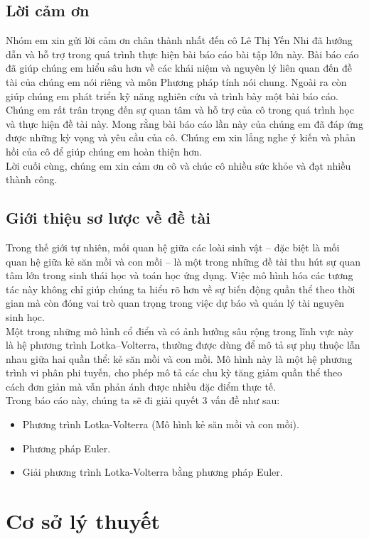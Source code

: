 \documentclass[a4paper,15pt]{article}
\begin{document}
\subsection{Lời cảm ơn}
Nhóm em xin gửi lời cảm ơn chân thành nhất đến cô Lê Thị Yến Nhi đã hướng dẫn và hỗ trợ trong quá trình thực hiện bài báo cáo bài tập lớn này. Bài báo cáo đã giúp chúng em hiểu sâu hơn về các khái niệm và nguyên lý liên quan đến đề tài của chúng em nói riêng và môn Phương pháp tính nói chung. Ngoài ra còn giúp chúng em phát triển kỹ năng nghiên cứu và trình bày một bài báo cáo. \\
Chúng em rất trân trọng đến sự quan tâm và hỗ trợ của cô trong quá trình học và thực hiện đề tài này. Mong rằng bài báo cáo lần này của chúng em đã đáp ứng được những kỳ vọng và yêu cầu của cô.
Chúng em xin lắng nghe ý kiến và phản hồi của cô để giúp chúng em hoàn thiện hơn.\\
Lời cuối cùng, chúng em xin cảm ơn cô và chúc cô nhiều sức khỏe và đạt nhiều thành công.
\subsection{Giới thiệu sơ lược về đề tài}
Trong thế giới tự nhiên, mối quan hệ giữa các loài sinh vật – đặc biệt là mối quan hệ giữa kẻ săn mồi và con mồi – là một trong những đề tài thu hút sự quan tâm lớn trong sinh thái học và toán học ứng dụng. Việc mô hình hóa các tương tác này không chỉ giúp chúng ta hiểu rõ hơn về sự biến động quần thể theo thời gian mà còn đóng vai trò quan trọng trong việc dự báo và quản lý tài nguyên sinh học.\\
Một trong những mô hình cổ điển và có ảnh hưởng sâu rộng trong lĩnh vực này là hệ phương trình Lotka–Volterra, thường được dùng để mô tả sự phụ thuộc lẫn nhau giữa hai quần thể: kẻ săn mồi và con mồi. Mô hình này là một hệ phương trình vi phân phi tuyến, cho phép mô tả các chu kỳ tăng giảm quần thể theo cách đơn giản mà vẫn phản ánh được nhiều đặc điểm thực tế.\\
Trong báo cáo này, chúng ta sẽ đi giải quyết 3 vấn đề như sau:
\begin{itemize}
    \item Phương trình Lotka-Volterra (Mô hình kẻ săn mồi và con mồi).
    \item Phương pháp Euler.
    \item Giải phương trình Lotka-Volterra bằng phương pháp Euler.
\end{itemize}
\newpage
\section{Cơ sở lý thuyết}
\end{document}
